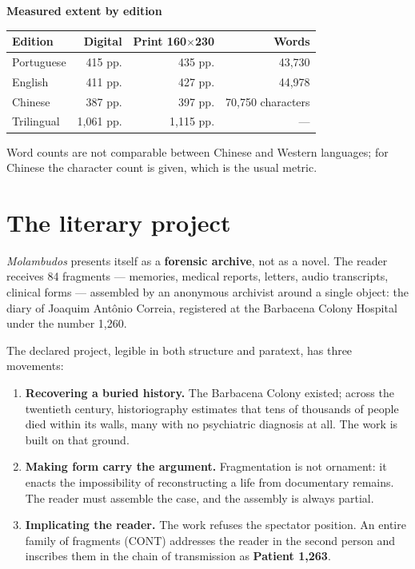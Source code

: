 \documentclass[11pt,a4paper]{article}
\begin{document}
\vspace{0.6em}
\noindent\textbf{Measured extent by edition}

\begin{center}\small
\begin{tabular}{@{}lrrr@{}}
\toprule
\textbf{Edition} & \textbf{Digital} & \textbf{Print 160$\times$230} & \textbf{Words} \\
\midrule
Portuguese & 415 pp. & 435 pp. & 43,730 \\
English    & 411 pp. & 427 pp. & 44,978 \\
Chinese    & 387 pp. & 397 pp. & 70,750 characters \\
Trilingual & 1,061 pp. & 1,115 pp. & --- \\
\bottomrule
\end{tabular}
\end{center}

\noindent\small Word counts are not comparable between Chinese and Western
languages; for Chinese the character count is given, which is the usual metric.

\section{The literary project}

\textit{Molambudos} presents itself as a \textbf{forensic archive}, not as a
novel. The reader receives 84 fragments --- memories, medical reports,
letters, audio transcripts, clinical forms --- assembled by an anonymous
archivist around a single object: the diary of Joaquim Antônio Correia,
registered at the Barbacena Colony Hospital under the number 1,260.

The declared project, legible in both structure and paratext, has three
movements:

\begin{enumerate}
\item \textbf{Recovering a buried history.} The Barbacena Colony existed;
across the twentieth century, historiography estimates that tens of thousands
of people died within its walls, many with no psychiatric diagnosis at all.
The work is built on that ground.

\item \textbf{Making form carry the argument.} Fragmentation is not ornament:
it enacts the impossibility of reconstructing a life from documentary
remains. The reader must assemble the case, and the assembly is always partial.

\item \textbf{Implicating the reader.} The work refuses the spectator
position. An entire family of fragments (CONT) addresses the reader in the
second person and inscribes them in the chain of transmission as
\textbf{Patient 1,263}.
\end{enumerate}
\end{document}
